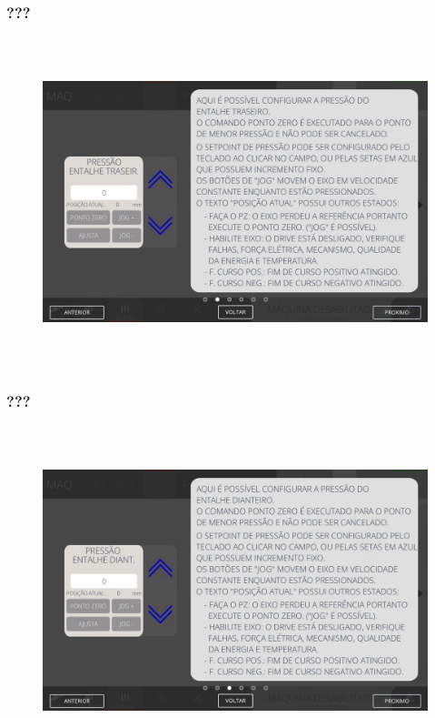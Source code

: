 \newpage
\thispagestyle{fancy}
\vspace*{\fill}
\subsubsection{\small{???}}
\begin{figure}[h]
  \centering
  \includegraphics[width=576px,height=360px]{src/imagesFlexo/05-slotter/settings/e-2.png}
   \label{}
\end{figure}
\vspace*{\fill}

\newpage
\thispagestyle{fancy}
\vspace*{\fill}
\subsubsection{\small{???}}
\begin{figure}[h]
  \centering
  \includegraphics[width=576px,height=360px]{src/imagesFlexo/05-slotter/settings/e-3.png}
   \label{}
\end{figure}
\vspace*{\fill}

